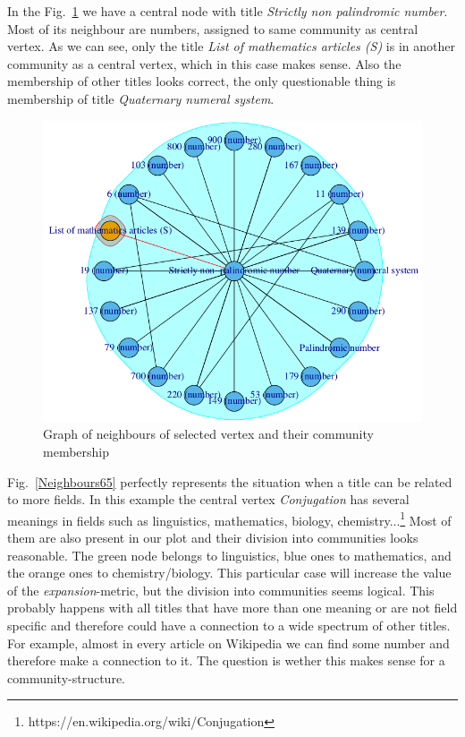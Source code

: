 \documentclass[paper=a4, fontsize=11pt]{scrartcl} %
\begin{document}
In the Fig.~\ref{Neighbours60} we have a central node with title \textit{Strictly non palindromic number}. Most of its neighbour are numbers, assigned to same community as central vertex. As we can see, only the title \textit{List of mathematics articles (S)} is in another community as a central vertex, which in this case makes sense. Also the membership of other titles looks correct, the only questionable thing is membership of title \textit{Quaternary numeral system}.

\begin{figure}
	\centering
	\includegraphics[scale=0.4,keepaspectratio]{Neighbours60}
	\caption{Graph of neighbours of selected vertex and their community membership}
	\label{Neighbours60}
\end{figure}

Fig.~\ref{Neighbours65} perfectly represents the situation when a title can be related to more fields. In this example the central vertex \textit{Conjugation} has several meanings in fields such as linguistics, mathematics, biology, chemistry...\footnote{https://en.wikipedia.org/wiki/Conjugation} Most of them are also present in our plot and their division into communities looks reasonable. The green node belongs to linguistics, blue ones to mathematics, and the orange ones to chemistry/biology. This particular case will increase the value of the \textit{expansion}-metric, but the division into communities seems logical. This probably happens with all titles that have more than one meaning or are not field specific and therefore could have a connection to a wide spectrum of other titles. For example, almost in every article on Wikipedia we can find some number and therefore make a connection to it. The question is wether this makes sense for a community-structure.
\end{document}
